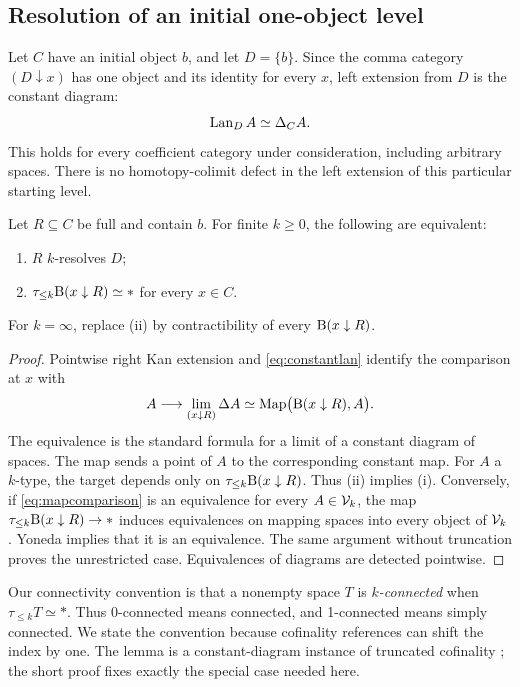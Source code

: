 \subsection{Resolution of an initial one-object level}

Let $C$ have an initial object $b$, and let $D=\{b\}$. Since the comma
category $(D\downarrow x)$ has one object and its identity for every $x$,
left extension from $D$ is the constant diagram:
\begin{equation}\label{eq:constantlan}
\operatorname{Lan}_D A\simeq\Delta_C A.
\end{equation}
This holds for every coefficient category under consideration, including
arbitrary spaces. There is no homotopy-colimit defect in the left extension
of this particular starting level.

\begin{lemma}\label{lem:criterion}
Let $R\subseteq C$ be full and contain $b$. For finite $k\geq0$, the
following are equivalent:
\begin{enumerate}[label=(\roman*)]
\item $R$ $k$-resolves $D$;
\item $\tau_{\leq k}\mathrm B(x\downarrow R)\simeq *$ for every $x\in C$.
\end{enumerate}
For $k=\infty$, replace (ii) by contractibility of every
$\mathrm B(x\downarrow R)$.
\end{lemma}

\begin{proof}
Pointwise right Kan extension and \eqref{eq:constantlan} identify the
comparison at $x$ with
\begin{equation}\label{eq:mapcomparison}
A\longrightarrow\operatorname*{lim}_{(x\downarrow R)}\Delta A
\simeq\operatorname{Map}\bigl(\mathrm B(x\downarrow R),A\bigr).
\end{equation}
The equivalence is the standard formula for a limit of a constant diagram of
spaces. The map sends a point of $A$ to the corresponding constant map.
For $A$ a $k$-type, the target depends only on
$\tau_{\leq k}\mathrm B(x\downarrow R)$. Thus (ii) implies (i).
Conversely, if \eqref{eq:mapcomparison} is an equivalence for every
$A\in\mathcal V_k$, the map
$\tau_{\leq k}\mathrm B(x\downarrow R)\to *$ induces equivalences on mapping
spaces into every object of $\mathcal V_k$. Yoneda implies that it is an
equivalence. The same argument without truncation proves the unrestricted
case. Equivalences of diagrams are detected pointwise.
\end{proof}

Our connectivity convention is that a nonempty space $T$ is
\emph{$k$-connected} when $\tau_{\leq k}T\simeq *$. Thus 0-connected
means connected, and 1-connected means simply connected. We state the
convention because cofinality references can shift the index by one. The
lemma is a constant-diagram instance of truncated cofinality \cite{Du};
the short proof fixes exactly the special case needed here.

